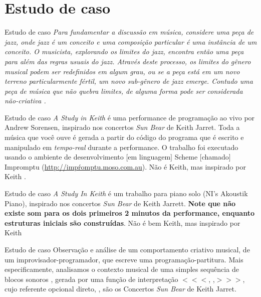 \documentclass[aspectratio=169]{beamer}
\begin{document}
\section{Estudo de caso}
\begin{frame}{Estudo de caso}
\emph{Para fundamentar a discussão em música, considere uma peça de \emph{jazz}, onde \emph{jazz} é um conceito e uma composição particular é uma instância de um conceito. O musicista, explorando os limites do \emph{jazz}, encontra então uma peça para além das regras usuais do \emph{jazz}. Através deste processo, os limites do gênero musical podem ser redefinidos em algum grau, ou se a peça está em um novo terreno particularmente fértil, um novo sub-gênero de \emph{jazz} emerge. Contudo uma peça de música que não quebra limites, de alguma forma pode ser considerada não-criativa \cite[p.~117]{McLean2011}.}
\end{frame}

\begin{frame}{Estudo de caso}
\emph{A Study in Keith} é uma performance de programação ao vivo por Andrew Sorensen, inspirado nos concertos \emph{Sun Bear} de Keith Jarret. Toda a música que você ouve é gerada a partir do código do programa que é escrito e manipulado em \emph{tempo-real} durante a performance. O trabalho foi executado usando o ambiente de desenvolvimento $[$em linguagem$]$ Scheme $[$chamado$]$ Impromptu (\url{http://impŕomptu.moso.com.au}). Não é Keith, mas inspirado por Keith \cite{sorensen_youtube_2014}.
\end{frame}

\begin{frame}{Estudo de caso}
\emph{A Study In Keith} é um trabalho para piano solo (NI's Akoustik Piano), inspirado nos concertos \emph{Sun Bear} de Keith Jarrett. \textbf{Note que não existe som para os dois primeiros 2 minutos da performance, enquanto estruturas iniciais são construídas}. Não é bem Keith, mas inspirado por Keith \cite{sorensen_keith_2009}
\end{frame}

\begin{frame}{Estudo de caso}
Observação e análise de um comportamento criativo musical, de um improvisador-programador, que escreve uma programação-partitura. Mais especificamente, analisamos o contexto musical de uma simples sequência de blocos sonoros , gerada por uma função de interpretação $<<<$, ,$>>>$, cujo referente opcional direto, , são os Concertos \emph{Sun Bear} de Keith Jarret.
\end{frame}
\end{document}
